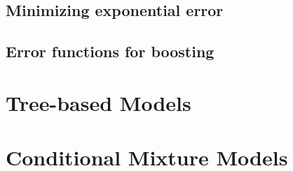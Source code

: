 \subsection{Minimizing exponential error}

\subsection{Error functions for boosting}



\section{Tree-based Models}

\section{Conditional Mixture Models}




























